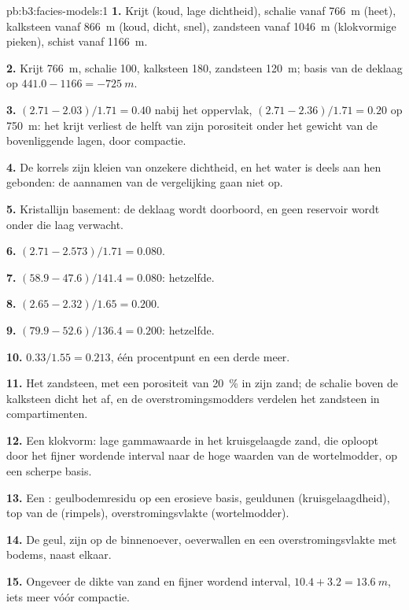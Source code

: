 \begin{solution}{pb:b3:facies-models:1}
\textbf{1.} Krijt (koud, lage dichtheid), schalie vanaf \qty{766}{m} (heet), kalksteen vanaf
\qty{866}{m} (koud, dicht, snel), zandsteen vanaf \qty{1046}{m} (klokvormige
pieken), schist vanaf \qty{1166}{m}.

\textbf{2.} Krijt \qty{766}{m}, schalie 100, kalksteen 180, zandsteen
\qty{120}{m}; basis van de deklaag op $441.0 - 1166 = \qty{-725}{m}$.

\textbf{3.} $(2.71 - 2.03)/1.71 = 0.40$ nabij het oppervlak, $(2.71 -
2.36)/1.71 = 0.20$ op \qty{750}{m}: het krijt verliest de helft van zijn porositeit
onder het gewicht van de bovenliggende lagen, door compactie.

\textbf{4.} De korrels zijn kleien van onzekere dichtheid, en het water is
deels aan hen gebonden: de aannamen van de vergelijking gaan niet op.

\textbf{5.} Kristallijn basement: de deklaag wordt doorboord, en geen reservoir wordt
onder die laag verwacht.

\textbf{6.} $(2.71 - 2.573)/1.71 = 0.080$.

\textbf{7.} $(58.9 - 47.6)/141.4 = 0.080$: hetzelfde.

\textbf{8.} $(2.65 - 2.32)/1.65 = 0.200$.

\textbf{9.} $(79.9 - 52.6)/136.4 = 0.200$: hetzelfde.

\textbf{10.} $0.33/1.55 = 0.213$, één procentpunt en een derde meer.

\textbf{11.} Het zandsteen, met een porositeit van \qty{20}{\percent} in zijn zand;
de schalie boven de kalksteen dicht het af, en de overstromingsmodders verdelen het
zandsteen in compartimenten.

\textbf{12.} Een klokvorm: lage gammawaarde in het kruisgelaagde zand, die oploopt door het fijner wordende interval
naar de hoge waarden van de wortelmodder, op een scherpe basis.

\textbf{13.} Een : geulbodemresidu op een erosieve
basis, geuldunen (kruisgelaagdheid), top van de  (rimpels), overstromingsvlakte
(wortelmodder).

\textbf{14.} De geul, zijn  op de binnenoever, oeverwallen en een
overstromingsvlakte met bodems, naast elkaar.

\textbf{15.} Ongeveer de dikte van zand en fijner wordend interval, $10.4 + 3.2 =
\qty{13.6}{m}$, iets meer vóór compactie.


\end{solution}
